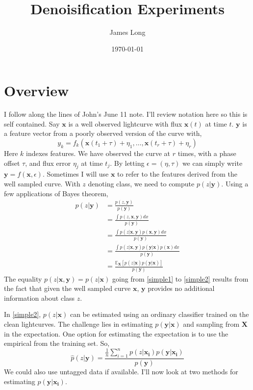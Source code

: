 \documentclass[10pt]{article}
\title{Denoisification Experiments}
\date{\today}
\author{James Long}
\begin{document}
\maketitle
\section{Overview}
I follow along the lines of John's June 11 note. I'll review notation here so this is self contained. Say $\mathbf{x}$ is a well observed lightcurve with flux $\mathbf{x}(t)$ at time $t$. $\mathbf{y}$ is a feature vector from a poorly observed version of the curve with,
\begin{equation}
y_k = f_k(\mathbf{x}(t_1 + \tau) + \eta_1, \ldots , \mathbf{x}(t_r + \tau) + \eta_r)
\end{equation}
Here $k$ indexes features. We have observed the curve at $r$ times, with a phase offset $\tau$, and flux error $\eta_j$ at time $t_j$. By letting $\epsilon = (\eta,\tau)$ we can simply write $\mathbf{y} = f(\mathbf{x},\epsilon)$. Sometimes I will use $\mathbf{x}$ to refer to the features derived from the well sampled curve. With $z$ denoting class, we need to compute $p(z|\mathbf{y})$. Using a few applications of Bayes theorem,
\begin{align}
p(z|\mathbf{y}) &= \frac{p(z,\mathbf{y})}{p(\mathbf{y})}\\
&= \frac{\int p(z,\mathbf{x},\mathbf{y}) dx}{p(\mathbf{y})}\\
&= \frac{\int p(z|\mathbf{x},\mathbf{y})p(\mathbf{x},\mathbf{y})dx}{p(\mathbf{y})}\\
&= \frac{\int p(z|\mathbf{x},\mathbf{y})p(\mathbf{y}|\mathbf{x})p(\mathbf{x})dx}{p(\mathbf{y})} \label{simple1} \\
&= \frac{\mathbb{E}_{\mathbf{X}} [p(z|\mathbf{x})p(\mathbf{y}|\mathbf{x})]}{p(\mathbf{y})} \label{simple2}
\end{align}
The equality $p(z|\mathbf{x},\mathbf{y}) = p(z|\mathbf{x})$ going from \eqref{simple1} to \eqref{simple2} results from the fact that given the well sampled curve $\mathbf{x}$, $\mathbf{y}$ provides no additional information about class $z$.

In \eqref{simple2}, $p(z|\mathbf{x})$ can be estimated using an ordinary classifier trained on the clean lightcurves. The challenge lies in estimating $p(\mathbf{y}|\mathbf{x})$ and sampling from $\mathbf{X}$ in the expectation. One option for estimating the expectation is to use the empirical from the training set. So,
\begin{equation}
\hat{p}(z|\mathbf{y}) = \frac{\frac{1}{n}\sum_{i=1}^n p(z|\mathbf{x_i})p(\mathbf{y}|\mathbf{x_i})}{p(\mathbf{y})}
\end{equation}
We could also use untagged data if available. I'll now look at two methods for estimating $p(\mathbf{y}|\mathbf{x_i})$.
\end{document}
